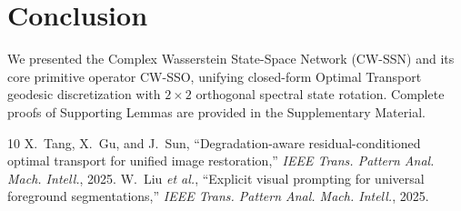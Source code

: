 \documentclass[10pt,journal,compsoc]{IEEEtran}
\begin{document}
\section{Conclusion}
We presented the Complex Wasserstein State-Space Network (CW-SSN) and its core primitive operator CW-SSO, unifying closed-form Optimal Transport geodesic discretization with $2 \times 2$ orthogonal spectral state rotation. Complete proofs of Supporting Lemmas are provided in the Supplementary Material.

\begin{thebibliography}{10}
X.~Tang, X.~Gu, and J.~Sun, ``Degradation-aware residual-conditioned optimal transport for unified image restoration,'' \emph{IEEE Trans. Pattern Anal. Mach. Intell.}, 2025.
W.~Liu \emph{et al.}, ``Explicit visual prompting for universal foreground segmentations,'' \emph{IEEE Trans. Pattern Anal. Mach. Intell.}, 2025.
\end{thebibliography}
\end{document}
